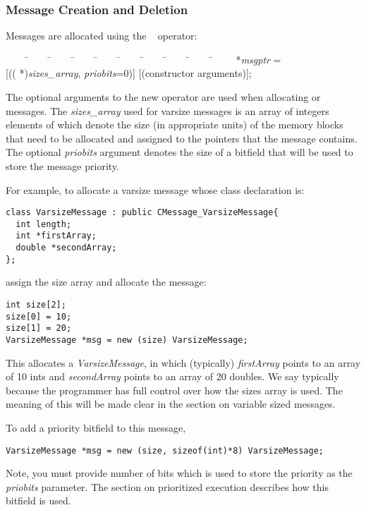 \subsubsection{Message Creation and Deletion}
\label{memory allocation}

Messages are allocated using the \CC\ 
operator:

\begin{tabbing}
~~~~ \=~~~~ \=~~~~ \=~~~~ \=~~~~ \=~~~~ \=~~~~ \=~~~~ \=~~~~ \=~~~~ \kill
\>  *{\it msgptr} = \\
\> \>  [(( *){\it sizes\_array},  {\it priobits}=0)] 
[(constructor arguments)]; \\
\end{tabbing}

The optional arguments to the new operator are used when allocating 
 or  messages. The {\it sizes\_array} 
used for varsize messages is an 
array of integers elements of which denote the size (in appropriate
units) of the memory blocks that need to be allocated and assigned to the
pointers that the message contains. The optional {\it priobits} argument 
denotes the size of a bitfield that will be used to store the message 
priority.

For example, to allocate a varsize message whose 
class declaration is:

\begin{verbatim}
class VarsizeMessage : public CMessage_VarsizeMessage{
  int length;
  int *firstArray;
  double *secondArray;
};
\end{verbatim}

assign the size array and allocate the message:
\begin{verbatim}
int size[2];
size[0] = 10;
size[1] = 20;
VarsizeMessage *msg = new (size) VarsizeMessage;
\end{verbatim}

This allocates a {\it VarsizeMessage}, in which (typically) {\it firstArray}
points to an array of 10 ints and {\it secondArray} points to an array
of 20 doubles. We say typically because the programmer has full control over 
how the sizes array is used. The meaning of this will be made clear in the 
section on variable sized messages.


To add a priority bitfield to this message, 
\begin{verbatim}
VarsizeMessage *msg = new (size, sizeof(int)*8) VarsizeMessage;
\end{verbatim}
Note, you must provide number of bits which is used to store the priority as 
the {\it priobits} parameter. The section on prioritized execution describes
how this bitfield is used.

